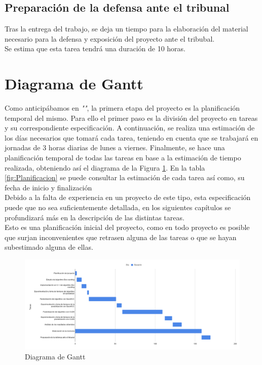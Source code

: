 \subsection{Preparación de la defensa ante el tribunal}
Tras la entrega del trabajo, se deja un tiempo para la elaboración del material necesario para la defensa y exposición del proyecto ante el tribubal.\\

Se estima que esta tarea tendrá una duración de 10 horas.


\section{Diagrama de Gantt}
Como anticipábamos en \textit{""}, la primera etapa del proyecto es la planificación temporal del mismo. Para ello el primer paso es la división del proyecto en tareas y su correspondiente especificación. A continuación, se realiza una estimación de los días necesarios que tomará cada tarea, teniendo en cuenta que se trabajará en jornadas de 3 horas diarias de lunes a viernes. Finalmente, se hace una planificación temporal de todas las tareas en base a la estimación de tiempo realizada, obteniendo así el diagrama de la Figura \ref{fig:Gantt}. En la tabla \ref{fig:Planificacion} se puede consultar la estimación de cada tarea así como, su fecha de inicio y finalización\\ Debido a la falta de experiencia en un proyecto de este tipo, esta especificación puede que no sea suficientemente detallada, en los siguientes capítulos se profundizará más en la descripción de las distintas tareas.\\ Esto es una planificación inicial del proyecto, como en todo proyecto es posible que surjan inconvenientes que retrasen alguna de las tareas o que se hayan subestimado alguna de ellas.

\begin{figure}[b]
    \centering
    \includegraphics[width=\textwidth]{img/Diagrama de Gantt.png}
    \caption{Diagrama de Gantt}
    \label{fig:Gantt}
\end{figure}

